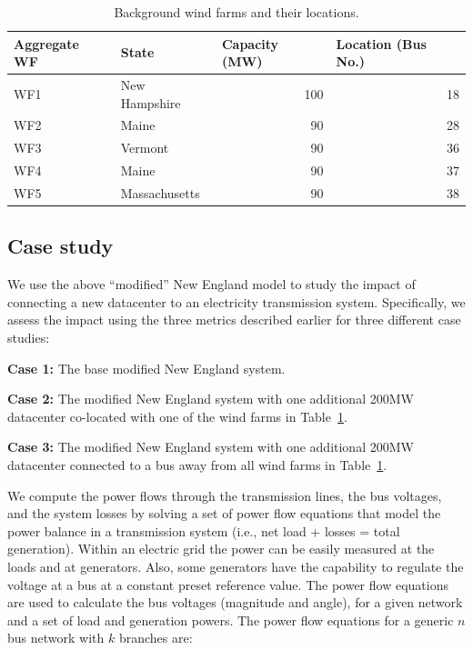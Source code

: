 \begin{table}[ht]
\begin{center}
\caption{Background wind farms and their locations.}
\begin{tabular}{|l|l|r|r|}
\hline
\multicolumn{1}{|l|}{\bf Aggregate WF} 
& \multicolumn{1}{l|}{\bf State} & \multicolumn{1}{l|}{\bf Capacity
  (MW)}
& \multicolumn{1}{l|}{\bf
  Location (Bus No.)} \\
\hline
WF1 & New Hampshire & 100 & 18\\
WF2 & Maine & 90 & 28 \\
WF3 & Vermont & 90 & 36 \\
WF4 & Maine & 90 & 37\\
WF5 & Massachusetts & 90 & 38\\
\hline

\end{tabular}
   \vspace{.05in}
\label{tab:wf_setting}
\end{center}
\end{table}

\subsection{Case study}
\label{sec:casestudy}

We use the above ``modified'' New England model to study the impact of
connecting a new datacenter to an electricity transmission system.
Specifically, we assess the impact using the three metrics described
earlier for three different case studies:

{\bf Case 1:} The base modified New England system.

{\bf Case 2:} The modified New England system with one additional
200MW datacenter co-located with one of the wind farms in
Table~\ref{tab:wf_setting}.

{\bf Case 3:} The modified New England system with one additional 200MW
datacenter connected to a bus away from all wind farms in 
Table~\ref{tab:wf_setting}.

We compute the power flows through the transmission lines, the bus
voltages, and the system losses by solving a set of power flow
equations that model the power balance in a transmission system (i.e.,
net load + losses = total generation).
Within an electric grid the power
can be easily measured at the loads and at generators. Also, some
generators have the capability to regulate the voltage at a bus at a
constant preset reference value. The power flow equations are used to
calculate the bus voltages (magnitude and angle), for a given network
and a set of load and generation powers. The power flow equations for a
generic $n$ bus network with $k$ branches are:

